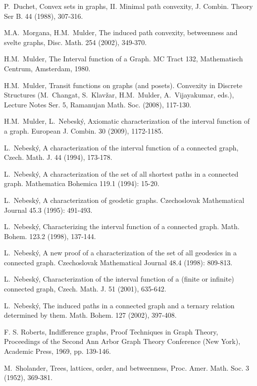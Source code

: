 \documentclass[10pt,a4paper]{article}
\begin{document}
\begin{thebibliography}{99}
 P.~Duchet, Convex sets in graphs, II. Minimal path convexity, J. Combin. Theory Ser B. 44 (1988), 307-316.


 M.A.~Morgana, H.M.~Mulder, The induced path convexity, betweenness and svelte graphs, Disc. Math. 254 (2002), 349-370. 

 H.M.~Mulder, The Interval function of a Graph. MC Tract 132,
Mathematisch Centrum, Amsterdam, 1980.


 H.M.~Mulder, Transit functions on graphs (and posets). 
Convexity in Discrete Structures (M.~Changat, S.~Klav\v{z}ar, H.M.~Mulder,
A.~Vijayakumar, eds.), Lecture Notes Ser. 5, Ramanujan Math. Soc. (2008), 117-130.

 H.M.~Mulder, L.~Nebesk\'{y}, Axiomatic characterization of the interval function of a graph.  European J. Combin. 30 (2009), 1172-1185.
                              
 L.~Nebesk\'{y}, A characterization of the interval function of a connected graph, Czech. Math. J. 44 (1994), 173-178.

L.~Nebesk\'{y}, A characterization of the set of all shortest paths in a connected
graph. Mathematica Bohemica 119.1 (1994): 15-20.

L.~Nebesk\'{y}, A characterization of geodetic graphs. Czechoslovak Mathematical
Journal 45.3 (1995): 491-493.

 L.~Nebesk\'{y}, Characterizing the interval function of a connected graph. Math. Bohem. 123.2 (1998), 137-144.

L.~Nebesk\'{y}, A new proof of a characterization of the set of all geodesics in a
connected graph. Czechoslovak Mathematical Journal 48.4 (1998): 809-813.

 L.~Nebesk\'{y}, Characterization of the interval function of a (finite or infinite) connected graph, Czech. Math. J. 51 (2001), 635-642.
                         
 L.~Nebesk\'{y}, The induced paths in a connected graph and a
ternary relation determined by them. Math. Bohem. 127 (2002), 397-408.

F. S. Roberts, Indifference graphs, Proof Techniques in Graph Theory, Proceedings of the Second Ann Arbor Graph Theory Conference (New York), Academic Press, 1969, pp. 139-146.

M.~Sholander, Trees, lattices, order, and betweenness, Proc. Amer. Math. Soc. 3 (1952), 369-381.

\end{thebibliography}
\end{document}
